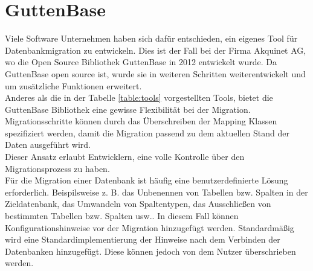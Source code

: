 \section{GuttenBase}
\label{section:grundlagen:gb}
Viele Software Unternehmen haben sich dafür entschieden, ein eigenes Tool für Datenbankmigration zu entwickeln. Dies ist der Fall bei der Firma Akquinet AG, wo die Open Source Bibliothek GuttenBase in 2012 entwickelt wurde. Da GuttenBase open source ist, wurde sie in weiteren Schritten weiterentwickelt und um zusätzliche Funktionen erweitert.\\
Anderes als die in der Tabelle \ref{table:tools} vorgestellten Tools, bietet die GuttenBase Bibliothek eine gewisse Flexibilität bei der Migration. Migrationsschritte können durch das Überschreiben der Mapping Klassen spezifiziert werden, damit die Migration passend zu dem aktuellen Stand der Daten ausgeführt wird.\\
Dieser Ansatz erlaubt Entwicklern, eine volle Kontrolle über den Migrationsprozess zu haben.\\
Für die Migration einer Datenbank ist häufig eine benutzerdefinierte Lösung erforderlich. Beispilsweise z. B. das Unbenennen von Tabellen bzw. Spalten in der Zieldatenbank, das Umwandeln von Spaltentypen, das Ausschließen von bestimmten Tabellen bzw. Spalten usw..
In diesem Fall können Konfigurationshinweise vor der Migration hinzugefügt werden. Standardmäßig wird eine Standardimplementierung der Hinweise nach dem Verbinden der Datenbanken hinzugefügt. Diese können jedoch von dem Nutzer überschrieben werden. 



